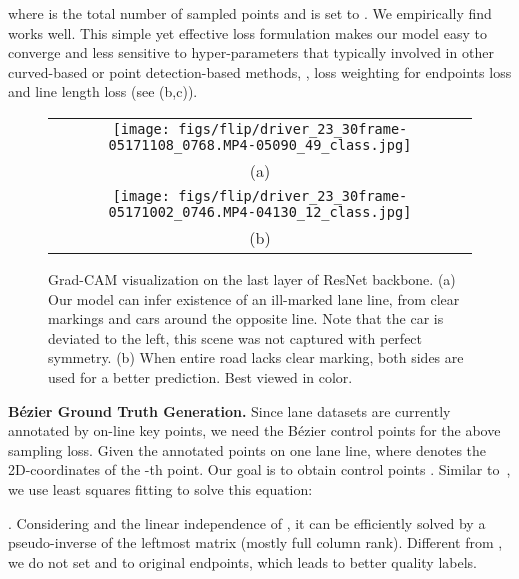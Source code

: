 \documentclass[10pt,twocolumn,letterpaper]{article}
\begin{document}
\vspace{-5mm}

where  is the total number of sampled points and is set to . We empirically find  works well.
This simple yet effective loss formulation makes our model easy to converge and less sensitive to hyper-parameters that typically involved in other curved-based or point detection-based methods, \eg, loss weighting for endpoints loss \cite{liu2021end} and line length loss \cite{tabelini2021keep} (see (b,c)).

\def\imh{2.8cm}
\begin{figure}[t]
\renewcommand{\tabcolsep}{1pt}
\centering
    \begin{tabular}{c}
    \texttt{[image: figs/flip/driver\_23\_30frame-05171108\_0768.MP4-05090\_49\_class.jpg]} \\
    (a) \\
    \texttt{[image: figs/flip/driver\_23\_30frame-05171002\_0746.MP4-04130\_12\_class.jpg]} \\
    (b) \\
    \end{tabular}
    \vspace{-2mm}
\caption{Grad-CAM \cite{selvaraju2017grad} visualization on the last layer of ResNet backbone. (a) Our model can infer existence of an ill-marked lane line, from clear markings and cars around the opposite line. Note that the car is deviated to the left, this scene was not captured with perfect symmetry. (b) When entire road lacks clear marking, both sides are used for a better prediction. Best viewed in color.}
\label{fig:featurevis}
\vspace{-4mm}
\end{figure}

\noindent \textbf{Bézier Ground Truth Generation.} Since lane datasets are currently annotated by on-line key points, we need the Bézier control points for the above sampling loss.
Given the annotated points  on one lane line, where  denotes the 2D-coordinates of the -th point.
Our goal is to obtain control points .
Similar to~\cite{liu2020abcnet}, we use least squares fitting to solve this equation:
\vspace{-2mm}

. Considering  and the linear independence of , it can be efficiently solved by a pseudo-inverse of the leftmost matrix (mostly full column rank). Different from \cite{liu2020abcnet}, we do not set  and  to original endpoints, which leads to better quality labels.
\end{document}
